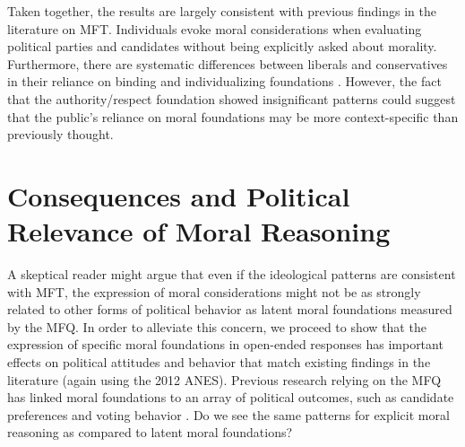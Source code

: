 \documentclass[12pt]{article}
\begin{document}
Taken together, the results are largely consistent with previous findings in the literature on MFT. Individuals evoke moral considerations when evaluating political parties and candidates without being explicitly asked about morality. Furthermore, there are systematic differences between liberals and conservatives in their reliance on binding and individualizing foundations \citep[see][for similar ideological differences when analyzing the content of life-narrative interviews]{mcadams2008family}. However, the fact that the authority/respect foundation showed insignificant patterns could suggest that the public's reliance on moral foundations may be more context-specific than previously thought.


\section*{Consequences and Political Relevance of Moral Reasoning}

A skeptical reader might argue that even if the ideological patterns are consistent with MFT, the expression of moral considerations might not be as strongly related to other forms of political behavior as latent moral foundations measured by the MFQ. In order to alleviate this concern, we proceed to show that the expression of specific moral foundations in open-ended responses has important effects on political attitudes and behavior that match existing findings in the literature (again using the 2012 ANES). Previous research relying on the MFQ has linked moral foundations to an array of political outcomes, such as candidate preferences \citep{iyer2010beyond} and voting behavior \citep{franks2015using}. Do we see the same patterns for explicit moral reasoning as compared to latent moral foundations?
\end{document}
